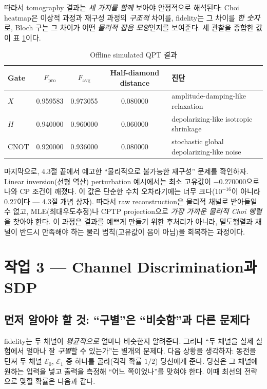 \documentclass[11pt,a4paper]{article}
\newcommand{\E}{\mathcal{E}}
\begin{document}
따라서 tomography 결과는 \emph{세 가지를 함께} 보아야 안정적으로 해석된다: Choi heatmap은 이상적 과정과 재구성 과정의 \emph{구조적} 차이를, fidelity는 그 차이를 \emph{한 숫자}로, Bloch 구는 그 차이가 어떤 \emph{물리적 잡음 모양}인지를 보여준다. 세 관찰을 종합한 값이 표 \ref{tab:qpt-results}이다.

\begin{table}[H]
\centering
\small
\begin{tabularx}{\textwidth}{lcccX}
\toprule
Gate & $F_{\mathrm{pro}}$ & $F_{\mathrm{avg}}$ & Half-diamond distance & 진단 \\
\midrule
$X$ & 0.959583 & 0.973055 & 0.080000 & amplitude-damping-like relaxation \\
$H$ & 0.940000 & 0.960000 & 0.060000 & depolarizing-like isotropic shrinkage \\
CNOT & 0.920000 & 0.936000 & 0.080000 & stochastic global depolarizing-like noise \\
\bottomrule
\end{tabularx}
\caption{Offline simulated QPT 결과}
\label{tab:qpt-results}
\end{table}

마지막으로, 4.3절 끝에서 예고한 ``물리적으로 불가능한 재구성'' 문제를 확인하자. Linear inversion(선형 역산) perturbation 예시에서는 최소 고유값이 $-0.270000$으로 나와 CP 조건이 깨졌다. 이 값은 단순한 수치 오차라기에는 너무 크다($10^{-16}$이 아니라 $0.27$이다 --- 4.3절 개념 상자). 따라서 raw reconstruction은 물리적 채널로 받아들일 수 없고, MLE(최대우도추정)나 CPTP projection으로 \emph{가장 가까운 물리적 Choi 행렬}을 찾아야 한다. 이 과정은 결과를 예쁘게 만들기 위한 후처리가 아니라, 밀도행렬과 채널이 반드시 만족해야 하는 물리 법칙(고유값이 음이 아님)을 회복하는 과정이다.

\section{작업 3 --- Channel Discrimination과 SDP}

\subsection{먼저 알아야 할 것: ``구별''은 ``비슷함''과 다른 문제다}

fidelity는 두 채널이 \emph{평균적으로} 얼마나 비슷한지 알려준다. 그러나 ``두 채널을 실제 실험에서 얼마나 잘 \emph{구별}할 수 있는가''는 별개의 문제다. 다음 상황을 생각하자: 동전을 던져 두 채널 $\E_0$, $\E_1$ 중 하나를 골라(각각 확률 $1/2$) 당신에게 준다. 당신은 그 채널에 원하는 입력을 넣고 출력을 측정해 ``어느 쪽이었나''를 맞혀야 한다. 이때 최선의 전략으로 맞힐 확률은 다음과 같다.
\end{document}
